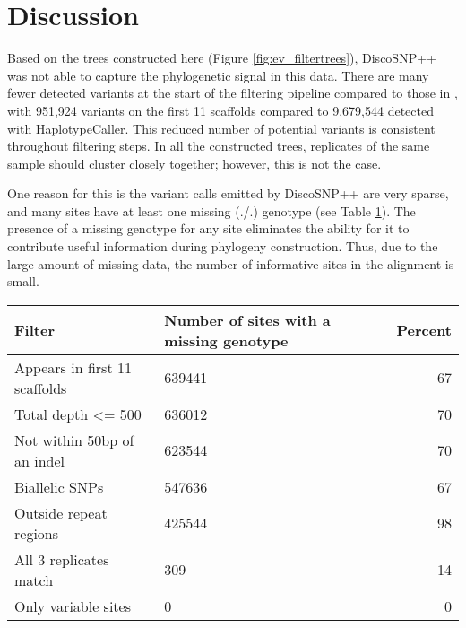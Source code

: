 \section{Discussion}

Based on the trees constructed here (Figure \ref{fig:ev_filtertrees}), DiscoSNP++ was not able to capture the phylogenetic signal in this data. There are many fewer detected variants at the start of the filtering pipeline compared to those in \textcite{orr_phylogenomic_2020}, with 951,924 variants on the first 11 scaffolds compared to 9,679,544 detected with HaplotypeCaller. This reduced number of potential variants is consistent throughout filtering steps. In all the constructed trees, replicates of the same sample should cluster closely together; however, this is not the case.

One reason for this is the variant calls emitted by DiscoSNP++ are very sparse, and many sites have at least one missing (./.) genotype (see Table \ref{tbl:ev_missing}). The presence of a missing genotype for any site eliminates the ability for it to contribute useful information during phylogeny construction. Thus, due to the large amount of missing data, the number of informative sites in the alignment is small. 

\begin{table}
\centering
\begin{tabularx}{.8\textwidth}{ l X r }
\toprule
\textbf{Filter} & \textbf{Number of sites with \newline a missing genotype} & \textbf{Percent}\\
\midrule
Appears in first 11 scaffolds & 639441 & 67\\
Total depth <= 500 & 636012 & 70\\
Not within 50bp of an indel & 623544 & 70\\
Biallelic SNPs & 547636 & 67\\
Outside repeat regions & 425544 & 98\\
All 3 replicates match & 309 & 14\\
Only variable sites & 0 & 0\\
\bottomrule
\end{tabularx}
\label{tbl:ev_missing}
\end{table}

